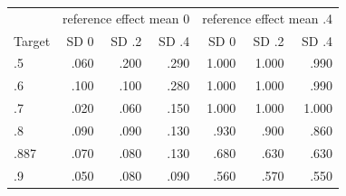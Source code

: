 \setlength{\tabcolsep}{3.5pt}
\begin{tabular}{lrrrrrr}
\hline
& \multicolumn{3}{c}{reference effect mean 0} & \multicolumn{3}{c}{reference effect mean .4} \\
Target & SD 0 & SD .2 & SD .4 & SD 0 & SD .2 & SD .4 \\
\hline
.5 & .060 & .200 & .290 & 1.000 & 1.000 & .990 \\
.6 & .100 & .100 & .280 & 1.000 & 1.000 & .990 \\
.7 & .020 & .060 & .150 & 1.000 & 1.000 & 1.000 \\
.8 & .090 & .090 & .130 & .930 & .900 & .860 \\
.887 & .070 & .080 & .130 & .680 & .630 & .630 \\
.9 & .050 & .080 & .090 & .560 & .570 & .550 \\
\hline
\end{tabular}
